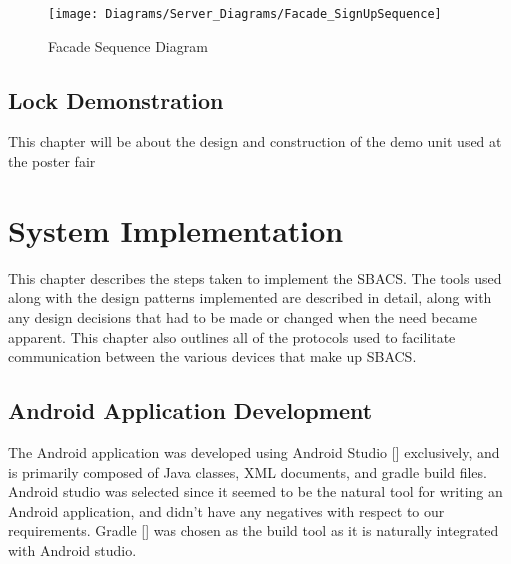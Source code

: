 \documentclass[12pt]{report}
\let\Oldsection\section
\renewcommand{\section}{\FloatBarrier\Oldsection}
\begin{document}
\begin{figure}
    \texttt{[image: Diagrams/Server\_Diagrams/Facade\_SignUpSequence]}
    \caption{Facade Sequence Diagram}
    \label{fig:facade-signup}
\end{figure}




\section{Lock Demonstration} \label{lock-demonstration}

This chapter will be about the design and construction of the demo unit used at the poster fair


\chapter{System Implementation} \label{system-implementation}

This chapter describes the steps taken to implement the SBACS. The tools used along with the design patterns implemented
are described in detail, along with any design decisions that had to be made or changed when the need became apparent.
This chapter also outlines all of the protocols used to facilitate communication between the various devices that make
up SBACS.


\section{Android Application Development} \label{android-application-development}

The Android application was developed using Android Studio [] exclusively, and is primarily composed of Java classes, XML
documents, and gradle build files. Android studio was selected since it seemed to be the natural tool for writing an
Android application, and didn't have any negatives with respect to our requirements. Gradle [] was chosen as the build
tool as it is naturally integrated with Android studio.
\end{document}
